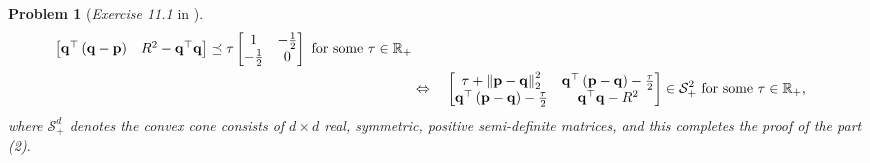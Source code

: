 \documentclass[11pt]{article}
\newtheorem{problem}{Problem}
\numberwithin{equation}{problem}
\begin{document}
\begin{problem} [\emph{Exercise 11.1} in \cite{calafiore2014optimization}]
{\begin{equation}
\begin{split}
\begin{bmatrix}
            \mathbf{q}^{\top} \left( \mathbf{q} - \mathbf{p} \right) & R^2 - \mathbf{q}^{\top} \mathbf{q}
        \end{bmatrix}
        \preceq \tau
        \begin{bmatrix}
            1 & - \frac{1}{2} \\ - \frac{1}{2} & 0
        \end{bmatrix}
        \textnormal{ for some $\tau \in \mathbb{R}_{+}$} \\
        &\Leftrightarrow \quad
        \begin{bmatrix}
            \tau + \left\| \mathbf{p} - \mathbf{q} \right\|_{2}^2 & \mathbf{q}^{\top} \left( \mathbf{p} - \mathbf{q} \right) - \frac{\tau}{2} \\
            \mathbf{q}^{\top} \left( \mathbf{p} - \mathbf{q} \right) - \frac{\tau}{2} & \mathbf{q}^{\top} \mathbf{q} - R^2
        \end{bmatrix}
        \in \mathcal{S}_{+}^2 \textnormal{ for some $\tau \in \mathbb{R}_{+}$,}
    \end{split}
\end{equation}
where $\mathcal{S}_{+}^d$ denotes the convex cone consists of $d \times d$ real, symmetric, positive semi-definite matrices, and this completes the proof of the part (2).
\medskip

}
\end{problem}
\end{document}
